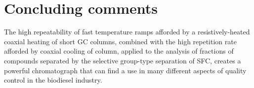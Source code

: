 \section{Concluding comments}

The high repeatability of fast temperature ramps afforded by a
resistively-heated coaxial heating of short GC columns, combined with the high
repetition rate afforded by coaxial cooling of column, applied to the analysis
of fractions of compounds separated by the selective group-type separation of
SFC, creates a powerful chromatograph that can find a use in many different
aspects of quality control in the biodiesel industry.

